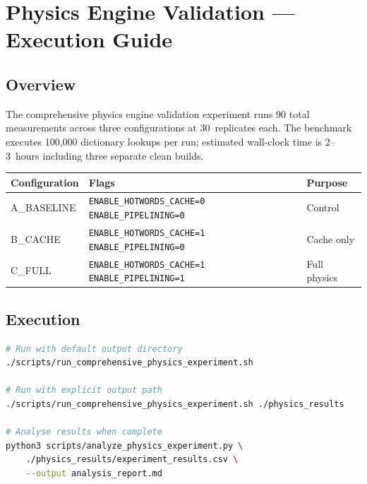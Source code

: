 
\section{Physics Engine Validation — Execution Guide}
\label{sec:physics-opt-execution}

\subsection{Overview}

The comprehensive physics engine validation experiment runs 90 total
measurements across three configurations at 30~replicates each. The
benchmark executes 100{,}000 dictionary lookups per run; estimated wall-clock
time is 2--3~hours including three separate clean builds.

\begin{center}
\begin{tabular}{lll}
\toprule
Configuration & Flags & Purpose \\
\midrule
A\_BASELINE & \texttt{ENABLE\_HOTWORDS\_CACHE=0 ENABLE\_PIPELINING=0} & Control \\
B\_CACHE    & \texttt{ENABLE\_HOTWORDS\_CACHE=1 ENABLE\_PIPELINING=0} & Cache only \\
C\_FULL     & \texttt{ENABLE\_HOTWORDS\_CACHE=1 ENABLE\_PIPELINING=1} & Full physics \\
\bottomrule
\end{tabular}
\end{center}

\subsection{Execution}


\begin{lstlisting}[language=bash]
# Run with default output directory
./scripts/run_comprehensive_physics_experiment.sh

# Run with explicit output path
./scripts/run_comprehensive_physics_experiment.sh ./physics_results

# Analyse results when complete
python3 scripts/analyze_physics_experiment.py \
    ./physics_results/experiment_results.csv \
    --output analysis_report.md
\end{lstlisting}

